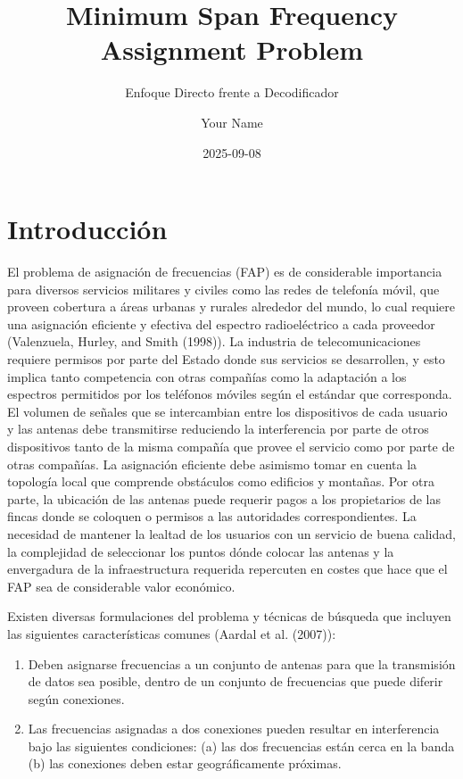 \documentclass[
  11pt,
  a4paper,
]{article}
\title{Minimum Span Frequency Assignment Problem}
\subtitle{Enfoque Directo frente a Decodificador}
\author{Your Name}
\date{2025-09-08}
\begin{document}
\maketitle

\section{Introducción}\label{introducciuxf3n}

El problema de asignación de frecuencias (FAP) es de considerable importancia para diversos servicios militares y civiles como las redes de telefonía móvil, que proveen cobertura a áreas urbanas y rurales alrededor del mundo, lo cual requiere una asignación eficiente y efectiva del espectro radioeléctrico a cada proveedor (Valenzuela, Hurley, and Smith (1998)). La industria de telecomunicaciones requiere permisos por parte del Estado donde sus servicios se desarrollen, y esto implica tanto competencia con otras compañías como la adaptación a los espectros permitidos por los teléfonos móviles según el estándar que corresponda. El volumen de señales que se intercambian entre los dispositivos de cada usuario y las antenas debe transmitirse reduciendo la interferencia por parte de otros dispositivos tanto de la misma compañía que provee el servicio como por parte de otras compañías. La asignación eficiente debe asimismo tomar en cuenta la topología local que comprende obstáculos como edificios y montañas. Por otra parte, la ubicación de las antenas puede requerir pagos a los propietarios de las fincas donde se coloquen o permisos a las autoridades correspondientes. La necesidad de mantener la lealtad de los usuarios con un servicio de buena calidad, la complejidad de seleccionar los puntos dónde colocar las antenas y la envergadura de la infraestructura requerida repercuten en costes que hace que el FAP sea de considerable valor económico.

Existen diversas formulaciones del problema y técnicas de búsqueda que incluyen las siguientes características comunes (Aardal et al. (2007)):

\begin{enumerate}
\item Deben asignarse frecuencias a un conjunto de antenas para que la transmisión de datos sea posible, dentro de un conjunto de frecuencias que puede diferir según conexiones.
\item Las frecuencias asignadas a dos conexiones pueden resultar en interferencia bajo las siguientes condiciones: (a) las dos frecuencias están cerca en la banda (b) las conexiones deben estar geográficamente próximas.
\end{enumerate}
\end{document}

